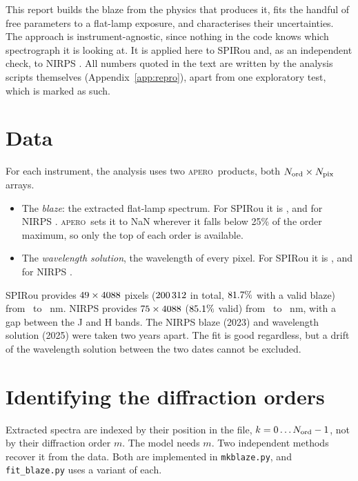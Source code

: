 \documentclass[11pt,a4paper]{article}
\newcommand{\code}[1]{\texttt{#1}}
\newcommand{\apero}{\textsc{apero}}
\begin{document}
This report builds the blaze from the physics that produces it, fits the handful of free parameters to a flat-lamp exposure, and characterises their uncertainties. The approach is instrument-agnostic, since nothing in the code knows which spectrograph it is looking at. It is applied here to SPIRou \citep{Donati2020} and, as an independent check, to NIRPS \citep{Artigau2024}. All numbers quoted in the text are written by the analysis scripts themselves (Appendix~\ref{app:repro}), apart from one exploratory test, which is marked as such.

\section{Data}
\label{sec:data}

For each instrument, the analysis uses two \apero\ products, both $N_{\rm ord}\times N_{\rm pix}$ arrays.
\begin{itemize}
\item The \emph{blaze}: the extracted flat-lamp spectrum. For SPIRou it is , and for NIRPS . \apero\ sets it to NaN wherever it falls below 25\% of the order maximum, so only the top of each order is available.
\item The \emph{wavelength solution}, the wavelength of every pixel. For SPIRou it is , and for NIRPS .
\end{itemize}

SPIRou provides $49\times4088$ pixels ($200\,312$ in total, $81.7\%$ with a valid blaze) from \spWmin\ to \spWmax~nm. NIRPS provides $75\times4088$ ($85.1\%$ valid) from \niWmin\ to \niWmax~nm, with a gap between the J and H bands. The NIRPS blaze (2023) and wavelength solution (2025) were taken two years apart. The fit is good regardless, but a drift of the wavelength solution between the two dates cannot be excluded.

\section{Identifying the diffraction orders}
\label{sec:orders}

Extracted spectra are indexed by their position in the file, $k = 0\dots N_{\rm ord}-1$, not by their diffraction order $m$. The model needs $m$. Two independent methods recover it from the data. Both are implemented in \code{mkblaze.py}, and \code{fit\_blaze.py} uses a variant of each.
\end{document}

